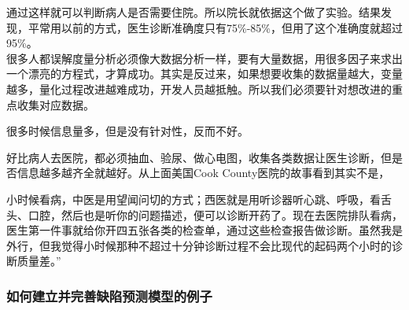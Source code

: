通过这样就可以判断病人是否需要住院。所以院长就依据这个做了实验。结果发现，平常用以前的方式，医生诊断准确度只有75\%-85\%，但用了这个准确度就超过95\%。\\
很多人都误解度量分析必须像大数据分析一样，要有大量数据，用很多因子来求出一个漂亮的方程式，才算成功。其实是反过来，如果想要收集的数据量越大，变量越多，量化过程改进越难成功，开发人员越抵触。所以我们必须要针对想改进的重点收集对应数据。

很多时候信息量多，但是没有针对性，反而不好。

好比病人去医院，都必须抽血、验尿、做心电图，收集各类数据让医生诊断，但是否信息越多越齐全就越好。从上面美国Cook
County医院的故事看到其实不是，

小时候看病，中医是用望闻问切的方式；西医就是用听诊器听心跳、呼吸，看舌头、口腔，然后也是听你的问题描述，便可以诊断开药了。现在去医院排队看病，医生第一件事就给你开四五张各类的检查单，通过这些检查报告做诊断。虽然我是外行，但我觉得小时候那种不超过十分钟诊断过程不会比现代的起码两个小时的诊断质量差。''\\

\hypertarget{ux7f8eux56fdux67d0ux5bb6ux533bux9662ux7684ux6545ux4e8b}{%
\subsubsection{如何建立并完善缺陷预测模型的例子}\label{ux7f8eux56fdux67d0ux5bb6ux533bux9662ux7684ux6545ux4e8b}}


